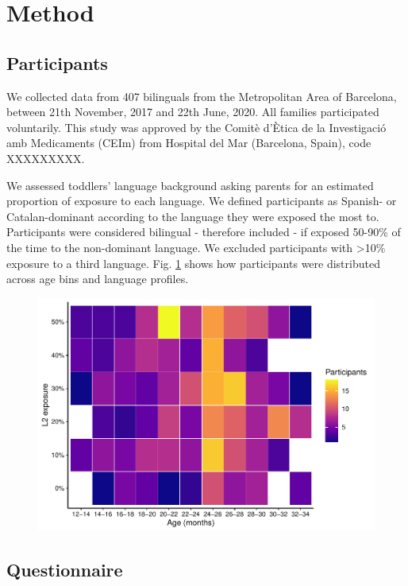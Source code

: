 \documentclass[english,man,man,floatsintext]{apa6}
\begin{document}
\hypertarget{method}{%
\section{Method}\label{method}}

\hypertarget{participants}{%
\subsection{Participants}\label{participants}}

We collected data from 407 bilinguals from the Metropolitan Area of Barcelona, between 21th November, 2017 and 22th June, 2020. All families participated voluntarily. This study was approved by the Comitè d'Ètica de la Investigació amb Medicaments (CEIm) from Hospital del Mar (Barcelona, Spain), code XXXXXXXXX.

We assessed toddlers' language background asking parents for an estimated proportion of exposure to each language. We defined participants as Spanish- or Catalan-dominant according to the language they were exposed the most to. Participants were considered bilingual - therefore included - if exposed 50-90\% of the time to the non-dominant language. We excluded participants with \textgreater{}10\% exposure to a third language. Fig. \ref{fig:lpdist} shows how participants were distributed across age bins and language profiles.

\begin{figure}

{\centering \includegraphics[width=0.8\linewidth]{trajectories_manuscript_files/figure-latex/lpdist-1} 

}

\caption{ }\label{fig:lpdist}
\end{figure}

\hypertarget{questionnaire}{%
\subsection{Questionnaire}\label{questionnaire}}
\end{document}
